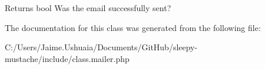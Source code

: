 \begin{DoxyReturn}{Returns}
bool Was the email successfully sent? 
\end{DoxyReturn}


The documentation for this class was generated from the following file\-:\begin{DoxyCompactItemize}
\item 
C\-:/\-Users/\-Jaime.\-Ushuaia/\-Documents/\-Git\-Hub/sleepy-\/mustache/include/class.\-mailer.\-php\end{DoxyCompactItemize}
